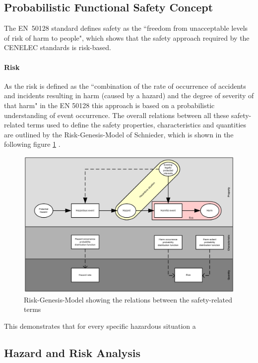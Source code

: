 \documentclass{template/openetcs_report}
\begin{document}
\subsection{Probabilistic Functional Safety Concept}

The EN~50128 standard defines safety as the ``freedom from unacceptable levels of risk of harm to people", which shows that the safety approach required by the CENELEC standards is risk-based.

\paragraph{Risk}

 As the risk is defined as the ``combination of the rate of occurrence of accidents and incidents resulting in harm (caused by a hazard) and the degree of severity  of that harm" in the EN 50128 this approach is based on a probabilistic understanding of event occurrence. The overall relations between all these safety-related terms used to define the safety properties, characteristics and quantities are outlined by the Risk-Genesis-Model of Schnieder, which is shown in the following figure \ref{fig:Risiko-Genese-Modell-eng} \cite{Schnieder.2010}.

\begin{figure}[htbp]
\centering
\includegraphics[width=0.8\linewidth]{bld_2013-06-19_Risiko-Genese-Modell-eng-2-0_jw}
\caption{Risk-Genesis-Model showing the relations between the safety-related terms \cite{Schnieder.2010}}
\label{fig:Risiko-Genese-Modell-eng}
\end{figure}

This demonstrates that for every specific hazardous situation a

 

\subsection{Hazard and Risk Analysis}
\end{document}
